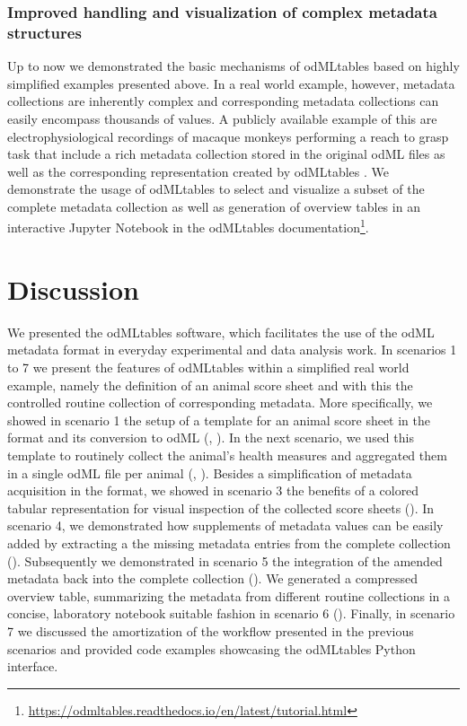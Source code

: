 {\subsubsection*{Improved handling and visualization of complex metadata structures}
Up to now we demonstrated the basic mechanisms of odMLtables based on highly simplified examples presented above. In a real world example, however, metadata collections are inherently complex and corresponding metadata collections can easily encompass thousands of values. A publicly available example of this are electrophysiological recordings of macaque monkeys performing a reach to grasp task that include a rich metadata collection stored in the original odML files as well as the corresponding  representation created by odMLtables \citep{Brochier_2018}. We demonstrate the usage of odMLtables to select and visualize a subset of the complete metadata collection as well as generation of overview tables in an interactive Jupyter Notebook in the odMLtables documentation\footnote{\url{https://odmltables.readthedocs.io/en/latest/tutorial.html}}.

\section{Discussion}
\label{sec:Discussion}

We presented the odMLtables software, which facilitates the use of the odML metadata format in everyday experimental and data analysis work. In scenarios 1 to 7 we present the features of odMLtables within a simplified real world example, namely the definition of an animal score sheet and with this the controlled routine collection of corresponding metadata. More specifically, we showed in scenario 1 the setup of a template for an animal score sheet in the  format and its conversion to odML (\fconvert, \fgenerate). In the next scenario, we used this template to routinely collect the animal's health measures and aggregated them in a single odML file per animal (\fconvert, \fmerge). Besides a simplification of metadata acquisition in the  format,  we showed in scenario 3 the benefits of a colored tabular representation for visual inspection of the collected score sheets (\fconvert). In scenario 4, we demonstrated how supplements of metadata values can be easily added by extracting a the missing metadata entries from the complete collection (\ffilter). Subsequently we demonstrated in scenario 5 the integration of the amended metadata back into the complete collection (\fmerge). We generated a compressed overview table, summarizing the metadata from different routine collections in a concise, laboratory notebook suitable fashion in scenario 6 (\fcompare). Finally, in scenario 7 we discussed the amortization of the workflow presented in the previous scenarios and provided code examples showcasing the odMLtables Python interface.

}
